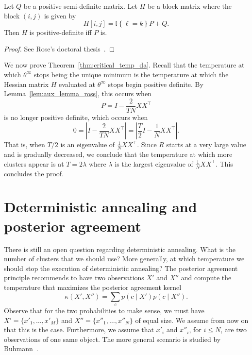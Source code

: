 \begin{lemma}
Let $Q$ be a positive semi-definite matrix. Let $H$ be a block
matrix where the block $(i,j)$ is given by
%
\begin{equation}
H[i,j] = \mathbb{I}\left\{\ell = k\right\} P + Q.
\end{equation}
%
Then $H$ is positive-definite iff $P$ is.
\label{lem:aux_lemma_ross}
\end{lemma}

\begin{proof}
See Rose's doctoral thesis~\cite{rose1991deterministic}.
\end{proof}

We now prove Theorem~\ref{thm:critical_temp_da}. Recall that the temperature at which $\theta^\infty$ stops being the unique minimum is the temperature at which the Hessian matrix $H$ evaluated at $\theta^\infty$ stops begin positive definite. By Lemma~\ref{lem:aux_lemma_ross}, this occurs when 
%
\begin{equation}
P = I - \frac{2}{TN}XX^\top
\end{equation}
%
is no longer positive definite, which occurs when
%
\begin{equation}
0 = \left|I - \frac{2}{TN}XX^\top\right| = \left|\frac{T}{2}I - \frac{1}{N}XX^\top\right|.
\end{equation}
%
That is, when $T/2$ is an eigenvalue of $\frac{1}{N}XX^\top$. Since $R$ starts at a very
large value and is gradually decreased, we conclude that the temperature at
which more clusters appear is at $T = 2\lambda$ where $\lambda$ is the largest eigenvalue of $\frac{1}{N}XX^\top$. This concludes the proof.

\section{Deterministic annealing and posterior agreement}
\label{sec:da_pa}

There is still an open question regarding deterministic annealing. What
is the number of clusters that we should use? More generally, at which
temperature we should stop the execution of deterministic annealing? The
posterior agreement principle recommends to have two observations $X'$ and
$X''$ and compute the temperature that maximizes the posterior agreement
kernel
%
\begin{equation}
\kappa(X', X'') = \sum_c p(c \mid X') p(c \mid X'').
\end{equation}
%
Observe that for the two probabilities to make sense, we must have $X' = \{x'_1, \ldots, x'_M\}$ and $X'' = \{x''_1, \ldots, x''_N\}$ of equal size. We assume from
now on that this is the case. Furthermore, we assume that $x'_i$ and $x''_i$, for $i \leq N$, are
two observations of one same object. The more general scenario is studied
by Buhmann~\cite{buhmann2010information}.

